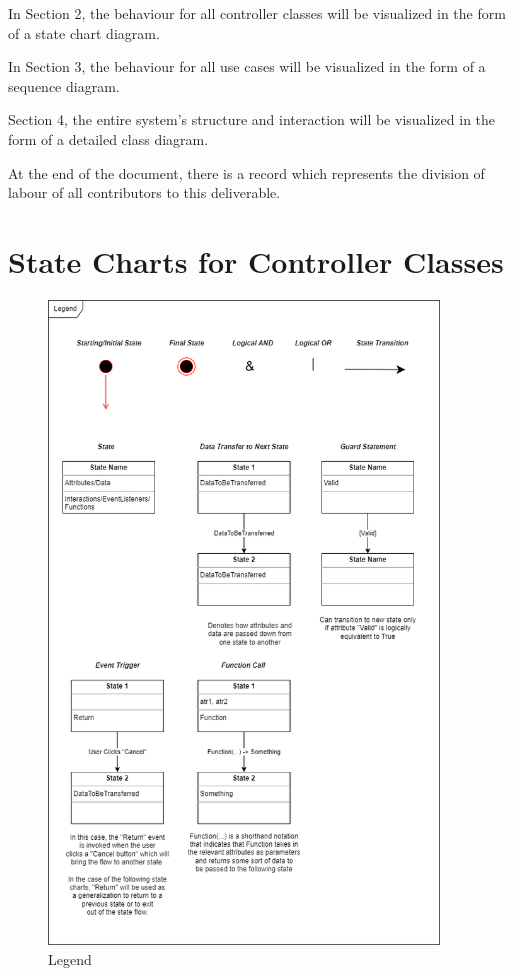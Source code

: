 \documentclass[]{article}
\begin{document}
In Section 2, the behaviour for all controller classes will be visualized in the form of a state chart diagram.

In Section 3, the behaviour for all use cases will be visualized in the form of a sequence diagram.

Section 4, the entire system's structure and interaction will be visualized in the form of a detailed class diagram.

At the end of the document, there is a record which represents the division of labour of all contributors to this deliverable.



\section{State Charts for Controller Classes}
\label{sec:state_charts_for_controller_classes}

\pagebreak

\begin{figure}[h]
	\centering
	\includegraphics[width=28em]{assets/d3_state_legend.png}
	\caption{Legend}
	\label{fig:acd}
\end{figure}
\end{document}

